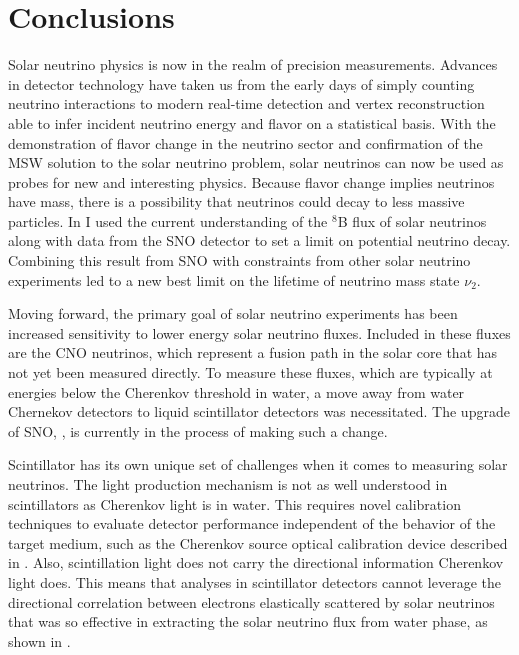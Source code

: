 \chapter{Conclusions}

Solar neutrino physics is now in the realm of precision measurements.
Advances in detector technology have taken us from the early days of simply counting neutrino interactions to modern real-time detection and vertex reconstruction able to infer incident neutrino energy and flavor on a statistical basis.
With the demonstration of flavor change in the neutrino sector and confirmation of the MSW solution to the solar neutrino problem, solar neutrinos can now be used as probes for new and interesting physics.
Because flavor change implies neutrinos have mass, there is a possibility that neutrinos could decay to less massive particles.
In  I used the current understanding of the $^8$B flux of solar neutrinos along with data from the SNO detector to set a limit on potential neutrino decay.
Combining this result from SNO with constraints from other solar neutrino experiments led to a new best limit on the lifetime of neutrino mass state $\nu_2$.

Moving forward, the primary goal of solar neutrino experiments has been increased sensitivity to lower energy solar neutrino fluxes.
Included in these fluxes are the CNO neutrinos, which represent a fusion path in the solar core that has not yet been measured directly.
To measure these fluxes, which are typically at energies below the Cherenkov threshold in water, a move away from water Chernekov detectors to liquid scintillator detectors was necessitated.
The upgrade of SNO, {\snop}, is currently in the process of making such a change.

Scintillator has its own unique set of challenges when it comes to measuring solar neutrinos.
The light production mechanism is not as well understood in scintillators as Cherenkov light is in water.
This requires novel calibration techniques to evaluate detector performance independent of the behavior of the target medium, such as the Cherenkov source optical calibration device described in .
Also, scintillation light does not carry the directional information Cherenkov light does.
This means that analyses in scintillator detectors cannot leverage the directional correlation between electrons elastically scattered by solar neutrinos that was so effective in extracting the solar neutrino flux from {\snop} water phase, as shown in .

